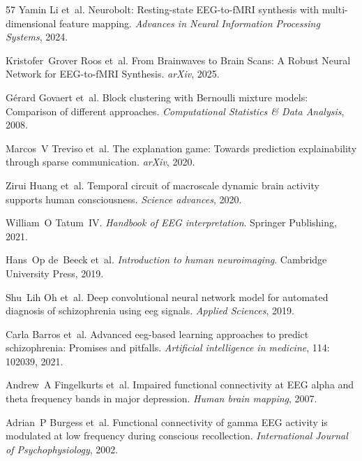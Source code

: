 \documentclass{article}
\begin{document}
\begin{thebibliography}{57}
Yamin Li et~al.
\newblock Neurobolt: Resting-state {EEG}-to-f{MRI} synthesis with multi-dimensional feature mapping.
\newblock \emph{Advances in Neural Information Processing Systems}, 2024.

Kristofer~Grover Roos et~al.
\newblock From {B}rainwaves to {B}rain {S}cans: {A} {R}obust {N}eural {N}etwork for {EEG}-to-f{MRI} {S}ynthesis.
\newblock \emph{arXiv}, 2025.

G{\'e}rard Govaert et~al.
\newblock Block clustering with {B}ernoulli mixture models: {C}omparison of different approaches.
\newblock \emph{Computational Statistics \& Data Analysis}, 2008.

Marcos~V Treviso et~al.
\newblock The explanation game: {T}owards prediction explainability through sparse communication.
\newblock \emph{arXiv}, 2020.

Zirui Huang et~al.
\newblock Temporal circuit of macroscale dynamic brain activity supports human consciousness.
\newblock \emph{Science advances}, 2020.

William~O Tatum~IV.
\newblock \emph{Handbook of {EEG} interpretation}.
\newblock Springer Publishing, 2021.

Hans~Op de~Beeck et~al.
\newblock \emph{Introduction to human neuroimaging}.
\newblock Cambridge University Press, 2019.

Shu~Lih Oh et~al.
\newblock Deep convolutional neural network model for automated diagnosis of schizophrenia using eeg signals.
\newblock \emph{Applied Sciences}, 2019.

Carla Barros et~al.
\newblock Advanced eeg-based learning approaches to predict schizophrenia: Promises and pitfalls.
\newblock \emph{Artificial intelligence in medicine}, 114: 102039, 2021.

Andrew~A Fingelkurts et~al.
\newblock Impaired functional connectivity at {EEG} alpha and theta frequency bands in major depression.
\newblock \emph{Human brain mapping}, 2007.

Adrian~P Burgess et~al.
\newblock Functional connectivity of gamma {EEG} activity is modulated at low frequency during conscious recollection.
\newblock \emph{International {J}ournal of {{P}}sychophysiology}, 2002.


\end{thebibliography}
\end{document}
